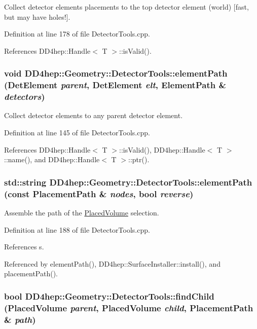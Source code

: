 Collect detector elements placements to the top detector element (world) \mbox{[}fast, but may have holes!\mbox{]}. 

Definition at line 178 of file DetectorTools.cpp.

References DD4hep::Handle$<$ T $>$::isValid().\hypertarget{namespace_d_d4hep_1_1_geometry_1_1_detector_tools_a33429898caa7f3ec3083fe50f04d01bc}{
\subsubsection[{elementPath}]{\setlength{\rightskip}{0pt plus 5cm}void DD4hep::Geometry::DetectorTools::elementPath ({\bf DetElement} {\em parent}, \/  {\bf DetElement} {\em elt}, \/  {\bf ElementPath} \& {\em detectors})}}
\label{namespace_d_d4hep_1_1_geometry_1_1_detector_tools_a33429898caa7f3ec3083fe50f04d01bc}


Collect detector elements to any parent detector element. 

Definition at line 145 of file DetectorTools.cpp.

References DD4hep::Handle$<$ T $>$::isValid(), DD4hep::Handle$<$ T $>$::name(), and DD4hep::Handle$<$ T $>$::ptr().\hypertarget{namespace_d_d4hep_1_1_geometry_1_1_detector_tools_a57debfb96b86738cbde272df6791a644}{
\subsubsection[{elementPath}]{\setlength{\rightskip}{0pt plus 5cm}std::string DD4hep::Geometry::DetectorTools::elementPath (const {\bf PlacementPath} \& {\em nodes}, \/  bool {\em reverse})}}
\label{namespace_d_d4hep_1_1_geometry_1_1_detector_tools_a57debfb96b86738cbde272df6791a644}


Assemble the path of the \hyperlink{class_d_d4hep_1_1_geometry_1_1_placed_volume}{PlacedVolume} selection. 

Definition at line 188 of file DetectorTools.cpp.

References s.

Referenced by elementPath(), DD4hep::SurfaceInstaller::install(), and placementPath().\hypertarget{namespace_d_d4hep_1_1_geometry_1_1_detector_tools_a1bb51943ab0395ee0b1e4441b6a6b92a}{
\subsubsection[{findChild}]{\setlength{\rightskip}{0pt plus 5cm}bool DD4hep::Geometry::DetectorTools::findChild ({\bf PlacedVolume} {\em parent}, \/  {\bf PlacedVolume} {\em child}, \/  {\bf PlacementPath} \& {\em path})}}
\label{namespace_d_d4hep_1_1_geometry_1_1_detector_tools_a1bb51943ab0395ee0b1e4441b6a6b92a}


